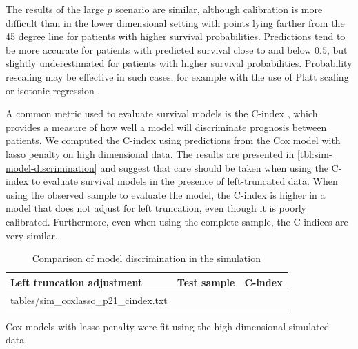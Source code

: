 \documentclass[11pt,final,fleqn]{article}\usepackage[]{graphicx}\usepackage[]{color}
\makeatletter
\theoremstyle{plain}
\newcommand*\ExpandableInput[1]{\@@input#1 }
\makeatother
\begin{document}
\begin{figure}[!ht]
\begin{minipage}{\linewidth}
\end{minipage}
\end{figure}

The results of the large $p$ scenario are similar, although calibration is more difficult than in the lower dimensional setting with points lying farther from the 45 degree line for patients with higher survival probabilities. Predictions tend to be more accurate for patients with predicted survival close to and below $0.5$, but slightly underestimated for patients with higher survival probabilities. Probability rescaling may be effective in such cases, for example with the use of Platt scaling \cite{platt1999scaling} or isotonic regression \cite{niculescu2005isotonic}.

A common metric used to evaluate survival models is the C-index \cite{harrell1996multivariable}, which provides a measure of how well a model will discriminate prognosis between patients. We computed the C-index using predictions from the Cox model with lasso penalty on high dimensional data. The results are presented in \autoref{tbl:sim-model-discrimination} and suggest that care should be taken when using the C-index to evaluate survival models in the presence of left-truncated data. When using the observed sample to evaluate the model, the C-index is higher in a model that does not adjust for left truncation, even though it is poorly calibrated. Furthermore, even when using the complete sample, the C-indices are very similar. 

\begin{table}[!ht]
\begin{center}
\begin{threeparttable}
\caption{Comparison of model discrimination in the simulation} \label{tbl:sim-model-discrimination}
\begin{tabularx}{.7\textwidth}{@{\extracolsep{\fill}}llr}
\hline
\multicolumn{1}{l}{Left truncation adjustment} & \multicolumn{1}{l}{Test sample} & \multicolumn{1}{l}{C-index} \\
\hline
\ExpandableInput{tables/sim_coxlasso_p21_cindex.txt}
\hline
\end{tabularx}
\scriptsize Cox models with lasso penalty were fit using the high-dimensional simulated data.
\end{threeparttable}
\end{center}
\end{table}
\end{document}
